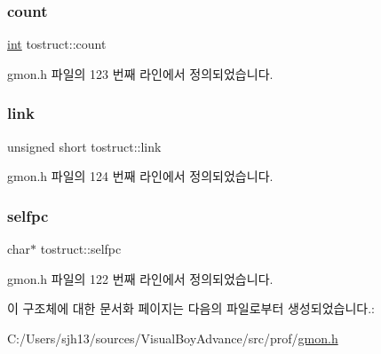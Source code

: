 \subsubsection{\texorpdfstring{count}{count}}
{\footnotesize\ttfamily \mbox{\hyperlink{_util_8cpp_a0ef32aa8672df19503a49fab2d0c8071}{int}} tostruct\+::count}



gmon.\+h 파일의 123 번째 라인에서 정의되었습니다.

\mbox{\label{structtostruct_a69307956aeadd440e3bc426e1ca7ce9c}} 
\subsubsection{\texorpdfstring{link}{link}}
{\footnotesize\ttfamily unsigned short tostruct\+::link}



gmon.\+h 파일의 124 번째 라인에서 정의되었습니다.

\mbox{\label{structtostruct_a0d2bae308211046a2b1c36b85f611044}} 
\subsubsection{\texorpdfstring{selfpc}{selfpc}}
{\footnotesize\ttfamily char$\ast$ tostruct\+::selfpc}



gmon.\+h 파일의 122 번째 라인에서 정의되었습니다.



이 구조체에 대한 문서화 페이지는 다음의 파일로부터 생성되었습니다.\+:\begin{DoxyCompactItemize}
\item 
C\+:/\+Users/sjh13/sources/\+Visual\+Boy\+Advance/src/prof/\mbox{\hyperlink{gmon_8h}{gmon.\+h}}\end{DoxyCompactItemize}
